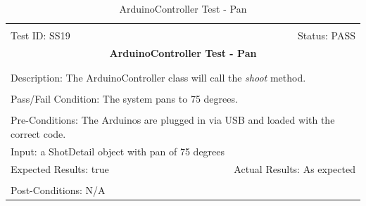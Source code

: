 \documentclass[11pt]{article}
\begin{document}
\begin{center}
\begin{table}[H]
\begin{tabular}{|l r|}\hline&\\[-2mm]
	Test ID: SS19	&Status: PASS\\[-3mm]
	\multicolumn{2}{|c|}{\textbf{\large{ArduinoController Test - Pan}}}\\&\\\hline&\\[-3mm]
	\multicolumn{2}{|p{\textwidth}|}{Description: The ArduinoController class will call the \textit{shoot} method.}\\[1mm]\hline&\\[-3mm]
	\multicolumn{2}{|p{\textwidth}|}{Pass/Fail Condition: The system pans to 75 degrees.}\\[1mm]\hline&\\[-3mm]
	\multicolumn{2}{|p{\textwidth}|}{Pre-Conditions: The Arduinos are plugged in via USB and loaded with the correct code.}\\[4mm]
	\multicolumn{2}{|p{\textwidth}|}{Input: a ShotDetail object with pan of 75 degrees}\\[2mm]\hline
	\multicolumn{1}{|p{0.49\textwidth}}{Expected Results: true}	&\multicolumn{1}{|p{0.45\textwidth}|}{Actual Results: As expected}\\\hline&\\[-3mm]
	\multicolumn{2}{|p{\textwidth}|}{Post-Conditions: N/A}\\\hline
\end{tabular}
\caption{ArduinoController Test - Pan}
\end{table}
\end{center}
\end{document}
